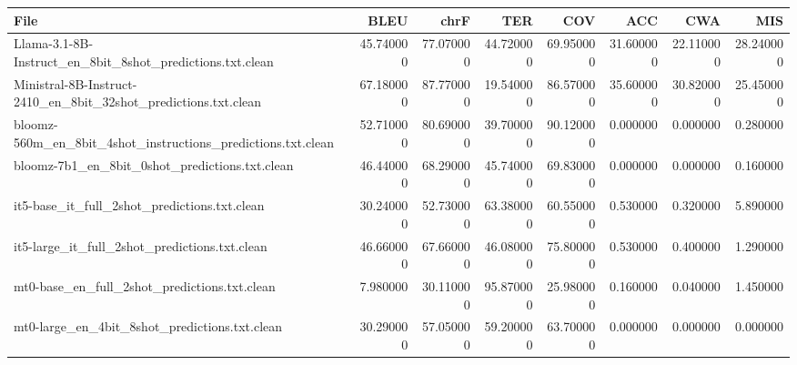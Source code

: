 \begin{tabular}{lrrrrrrr}
\toprule
File & BLEU & chrF & TER & COV & ACC & CWA & MIS \\
\midrule
Llama-3.1-8B-Instruct_en_8bit_8shot_predictions.txt.clean & 45.740000 & 77.070000 & 44.720000 & 69.950000 & 31.600000 & 22.110000 & 28.240000 \\
Ministral-8B-Instruct-2410_en_8bit_32shot_predictions.txt.clean & 67.180000 & 87.770000 & 19.540000 & 86.570000 & 35.600000 & 30.820000 & 25.450000 \\
bloomz-560m_en_8bit_4shot_instructions_predictions.txt.clean & 52.710000 & 80.690000 & 39.700000 & 90.120000 & 0.000000 & 0.000000 & 0.280000 \\
bloomz-7b1_en_8bit_0shot_predictions.txt.clean & 46.440000 & 68.290000 & 45.740000 & 69.830000 & 0.000000 & 0.000000 & 0.160000 \\
it5-base_it_full_2shot_predictions.txt.clean & 30.240000 & 52.730000 & 63.380000 & 60.550000 & 0.530000 & 0.320000 & 5.890000 \\
it5-large_it_full_2shot_predictions.txt.clean & 46.660000 & 67.660000 & 46.080000 & 75.800000 & 0.530000 & 0.400000 & 1.290000 \\
mt0-base_en_full_2shot_predictions.txt.clean & 7.980000 & 30.110000 & 95.870000 & 25.980000 & 0.160000 & 0.040000 & 1.450000 \\
mt0-large_en_4bit_8shot_predictions.txt.clean & 30.290000 & 57.050000 & 59.200000 & 63.700000 & 0.000000 & 0.000000 & 0.000000 \\
\bottomrule
\end{tabular}

